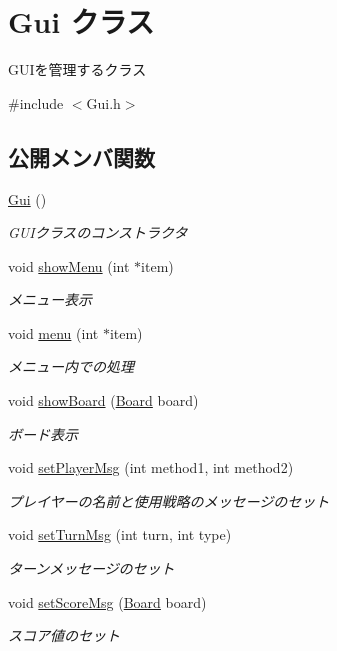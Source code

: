 \hypertarget{class_gui}{}\section{Gui クラス}
\label{class_gui}


G\+U\+Iを管理するクラス  




{\ttfamily \#include $<$Gui.\+h$>$}

\subsection*{公開メンバ関数}
\begin{DoxyCompactItemize}
\item 
\mbox{\hyperlink{class_gui_ab2655dbb6d3a91d7e90cb83dad6c0450}{Gui}} ()
\begin{DoxyCompactList}\small\item\em G\+U\+Iクラスのコンストラクタ \end{DoxyCompactList}\item 
void \mbox{\hyperlink{class_gui_afb242c53d9727caf2f41ab66eaf60fe8}{show\+Menu}} (int $\ast$item)
\begin{DoxyCompactList}\small\item\em メニュー表示 \end{DoxyCompactList}\item 
void \mbox{\hyperlink{class_gui_a5a9a47abd40187c04a2761804efe2bb7}{menu}} (int $\ast$item)
\begin{DoxyCompactList}\small\item\em メニュー内での処理 \end{DoxyCompactList}\item 
void \mbox{\hyperlink{class_gui_a24335264c09d1563075d98d2563cb186}{show\+Board}} (\mbox{\hyperlink{class_board}{Board}} board)
\begin{DoxyCompactList}\small\item\em ボード表示 \end{DoxyCompactList}\item 
void \mbox{\hyperlink{class_gui_a2bedfb4563e53061c62f110fbe4d15ed}{set\+Player\+Msg}} (int method1, int method2)
\begin{DoxyCompactList}\small\item\em プレイヤーの名前と使用戦略のメッセージのセット \end{DoxyCompactList}\item 
void \mbox{\hyperlink{class_gui_a90f07e09f9c4a36d9708342713ef4662}{set\+Turn\+Msg}} (int turn, int type)
\begin{DoxyCompactList}\small\item\em ターンメッセージのセット \end{DoxyCompactList}\item 
void \mbox{\hyperlink{class_gui_aadfc89252ff18f6a26b1eb4a99090c9a}{set\+Score\+Msg}} (\mbox{\hyperlink{class_board}{Board}} board)
\begin{DoxyCompactList}\small\item\em スコア値のセット \end{DoxyCompactList}\end{DoxyCompactItemize}


